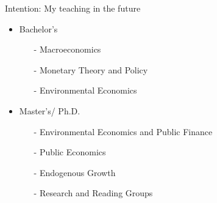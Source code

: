 \begin{frame}{Intention: My teaching in the future}

\begin{itemize}
	\item Bachelor's
	\begin{itemize}
		\item[-] Macroeconomics
		\item[-] Monetary Theory and Policy
		\item[-] Environmental Economics 
	\end{itemize}
	\item Master's/ Ph.D.
	\begin{itemize}
		\item[-] Environmental Economics and Public Finance
		\item[-] Public Economics
		\item[-] Endogenous Growth
		\item[-] Research and Reading Groups
	\end{itemize}
\end{itemize}
\end{frame}

